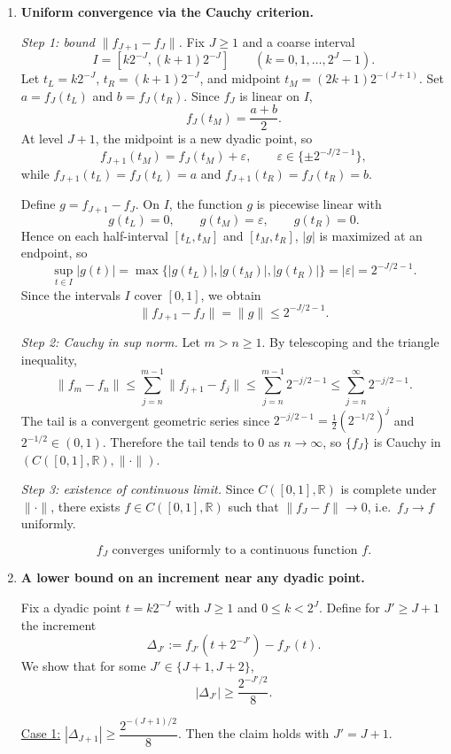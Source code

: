 \documentclass{article}
\begin{document}
\begin{enumerate}
\item[(a)] \textbf{Uniform convergence via the Cauchy criterion.}

\medskip
\noindent\emph{Step 1: bound $\|f_{J+1}-f_J\|$.}
Fix $J\ge 1$ and a coarse interval
\[
I=[k2^{-J},(k+1)2^{-J}]\qquad(k=0,1,\dots,2^J-1).
\]
Let $t_L=k2^{-J}$, $t_R=(k+1)2^{-J}$, and midpoint $t_M=(2k+1)2^{-(J+1)}$.
Set $a=f_J(t_L)$ and $b=f_J(t_R)$. Since $f_J$ is linear on $I$,
\[
f_J(t_M)=\frac{a+b}{2}.
\]
At level $J+1$, the midpoint is a new dyadic point, so
\[
f_{J+1}(t_M)=f_J(t_M)+\varepsilon,\qquad \varepsilon\in\{\pm 2^{-J/2-1}\},
\]
while $f_{J+1}(t_L)=f_J(t_L)=a$ and $f_{J+1}(t_R)=f_J(t_R)=b$.

Define $g=f_{J+1}-f_J$. On $I$, the function $g$ is piecewise linear with
\[
g(t_L)=0,\qquad g(t_M)=\varepsilon,\qquad g(t_R)=0.
\]
Hence on each half-interval $[t_L,t_M]$ and $[t_M,t_R]$, $|g|$ is maximized at an endpoint, so
\[
\sup_{t\in I}|g(t)|=\max\{|g(t_L)|,|g(t_M)|,|g(t_R)|\}=|\varepsilon|=2^{-J/2-1}.
\]
Since the intervals $I$ cover $[0,1]$, we obtain
\[
\|f_{J+1}-f_J\|=\|g\|\le 2^{-J/2-1}.
\tag{A1}
\]

\medskip
\noindent\emph{Step 2: Cauchy in sup norm.}
Let $m>n\ge 1$. By telescoping and the triangle inequality,
\[
\|f_m-f_n\|
\le \sum_{j=n}^{m-1}\|f_{j+1}-f_j\|
\le \sum_{j=n}^{m-1}2^{-j/2-1}
\le \sum_{j=n}^{\infty}2^{-j/2-1}.
\]
The tail is a convergent geometric series since $2^{-j/2-1}=\frac12(2^{-1/2})^j$ and $2^{-1/2}\in(0,1)$.
Therefore the tail tends to $0$ as $n\to\infty$, so $\{f_J\}$ is Cauchy in $(C([0,1],\mathbb{R}),\|\cdot\|)$.

\medskip
\noindent\emph{Step 3: existence of continuous limit.}
Since $C([0,1],\mathbb{R})$ is complete under $\|\cdot\|$, there exists $f\in C([0,1],\mathbb{R})$ such that
$\|f_J-f\|\to 0$, i.e.\ $f_J\to f$ uniformly.

\[
\boxed{\text{$f_J$ converges uniformly to a continuous function $f$.}}
\]

\item[(b)] \textbf{A lower bound on an increment near any dyadic point.}

Fix a dyadic point $t=k2^{-J}$ with $J\ge 1$ and $0\le k<2^J$.
Define for $J'\ge J+1$ the increment
\[
\Delta_{J'}:=f_{J'}(t+2^{-J'})-f_{J'}(t).
\]
We show that for some $J'\in\{J+1,J+2\}$,
\[
|\Delta_{J'}|\ge \frac{2^{-J'/2}}{8}.
\]

\medskip
\noindent\underline{Case 1:} $|\Delta_{J+1}|\ge \dfrac{2^{-(J+1)/2}}{8}$. Then the claim holds with $J'=J+1$.


\end{enumerate}
\end{document}
